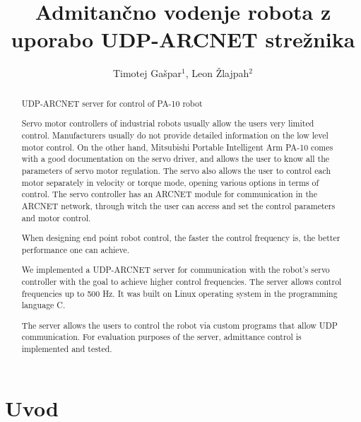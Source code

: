 \documentclass[a4paper]{article}
\begin{document}
\title{Admitančno vodenje robota z uporabo UDP-ARCNET strežnika}

\author{Timotej Gašpar$^{1}$, Leon Žlajpah$^{2}$} %



\maketitle


\begin{abstract}{UDP-ARCNET server for control of PA-10 robot}

Servo motor controllers of industrial robots usually allow the users very limited control. Manufacturers usually do not provide detailed information on the low level motor control. On the other hand, Mitsubishi Portable Intelligent Arm PA-10 comes with a good documentation on the servo driver, and allows the user to know all the parameters of servo motor regulation. The servo also allows the user to control each motor separately in velocity or torque mode, opening various options in terms of control. The servo controller has an ARCNET module for communication in the ARCNET network, through witch the user can access and set the control parameters and motor control.

When designing end point robot control, the faster the control frequency is, the better performance one can achie\-ve. 

We implemented a UDP-ARCNET server for communication with the robot's servo controller with the goal to achieve higher control frequencies. The server allows control frequencies up to 500 Hz. It was built on Linux operating system in the programming language C.

The server allows the users to control the robot via custom programs that allow UDP communication. For evaluation purposes of the server, admittance control is implemented and tested.

\end{abstract}



\section{Uvod}
\end{document}
